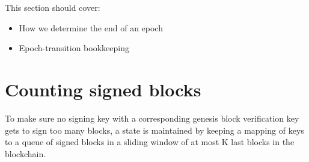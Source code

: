 \documentclass[11pt,a4paper]{article}
\newcommand{\type}[1]{\mathsf{#1}}
\begin{document}
This section should cover:
\begin{itemize}
\item How we determine the end of an epoch
\item Epoch-transition bookkeeping
\end{itemize}

\section{Counting signed blocks}

\newcommand{\BSCEnv}{\type{BSCEnv}}
\newcommand{\BSCState}{\type{BSCState}}

To make sure no signing key with a corresponding genesis block verification
key gets to sign too many blocks, a state is maintained by keeping a mapping
of keys to a queue of signed blocks in a sliding window of at most K last
blocks in the blockchain.
\end{document}
